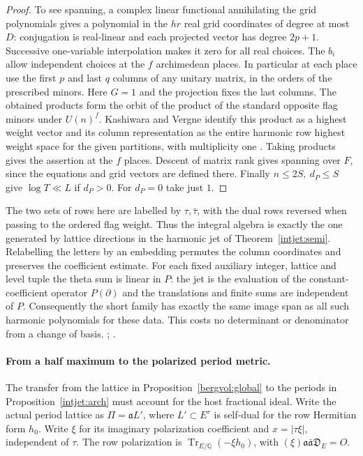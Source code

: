 \begin{proof}
To see spanning, a complex linear functional annihilating the
grid polynomials gives a polynomial in the \(hr\) real grid
coordinates of degree at most \(D\): conjugation is real-linear
and each projected vector has degree \(2p+1\). Successive
one-variable interpolation makes it zero for all real choices.
The \(b_i\) allow independent choices at the \(f\) archimedean
places. In particular at each place use the first \(p\) and last
\(q\) columns of any unitary matrix, in the orders of the
prescribed minors. Here \(G=1\) and the projection fixes the
last columns. The obtained products form the orbit of the
product of the standard opposite flag minors under \(U(n)^f\).
Kashiwara and Vergne identify this product as a highest weight
vector and its column representation as the entire harmonic
row highest weight space for the given partitions, with multiplicity
one \cite[unitary case, \S6, Proposition~6.1 and Theorem~6.3]{kashiwara-vergne}.
Taking products gives the assertion at the \(f\) places. Descent
of matrix rank gives spanning over \(F\), since the equations
and grid vectors are defined there. Finally \(n\le2S,\ d_P\le S\)
give \(\log T\ll L\) if \(d_P>0\). For \(d_P=0\) take just \(1\).
\end{proof}
The two sets of rows here are labelled by
\(\tau,\bar\tau\), with the dual rows reversed when passing to
the ordered flag weight. Thus the integral algebra is exactly
the one generated by lattice directions in the harmonic jet of
Theorem~\ref{intjet:semi}. Relabelling the letters by an embedding
permutes the column coordinates and preserves the coefficient
estimate. For each fixed auxiliary integer, lattice and level
tuple the theta sum is linear in \(P\): the jet is the evaluation
of the constant-coefficient operator \(P(\partial)\) and the
translations and finite sums are independent of \(P\). Consequently
the short family has exactly the same image span as all such
harmonic polynomials for these data. This costs no determinant
or denominator from a change of basis.
;
.

\paragraph{From a half maximum to the polarized period metric.}
The transfer from the lattice in Proposition~\ref{bergvol:global}
to the periods in Proposition~\ref{intjet:arch} must account for
the host fractional ideal. Write the actual period lattice as
\(\Pi=\mathfrak a L'\), where \(L'\subset E^r\) is self-dual
for the row Hermitian form \(h_0\). Write \(\xi\) for its
imaginary polarization coefficient and \(x=|\tau\xi|\),
independent of \(\tau\). The row polarization is
\(\operatorname{Tr}_{E/\mathbb Q}(-\xi h_0)\), with
\((\xi)\mathfrak a\bar{\mathfrak a}\mathfrak D_E=O\).

